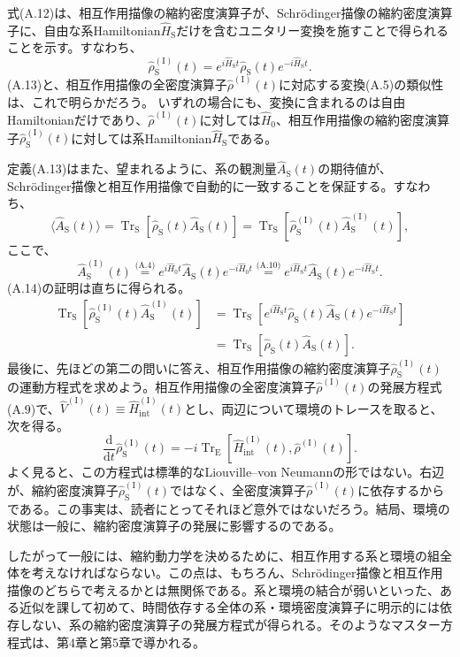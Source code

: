 式(A.12)は、相互作用描像の縮約密度演算子が、Schrödinger描像の縮約密度演算子に、自由な系Hamiltonian$\hat H_{\mathrm S}$だけを含むユニタリー変換を施すことで得られることを示す。すなわち、
\begin{equation}
\hat\rho_{\mathrm S}^{(\mathrm I)}(t)=e^{i\hat H_{\mathrm S}t}\hat\rho_{\mathrm S}(t)e^{-i\hat H_{\mathrm S}t}.\tag{A.13}
\end{equation}
(A.13)と、相互作用描像の全密度演算子$\hat\rho^{(\mathrm I)}(t)$に対応する変換(A.5)の類似性は、これで明らかだろう。
\hypertarget{srcpage:382}{}\label{srcpage:382}
いずれの場合にも、変換に含まれるのは自由Hamiltonianだけであり、$\hat\rho^{(\mathrm I)}(t)$に対しては$\hat H_0$、相互作用描像の縮約密度演算子$\hat\rho_{\mathrm S}^{(\mathrm I)}(t)$に対しては系Hamiltonian$\hat H_{\mathrm S}$である。

定義(A.13)はまた、望まれるように、系の観測量$\hat A_{\mathrm S}(t)$の期待値が、Schrödinger描像と相互作用描像で自動的に一致することを保証する。すなわち、
\begin{equation}
\langle\hat A_{\mathrm S}(t)\rangle=\operatorname{Tr}_{\mathrm S}[\hat\rho_{\mathrm S}(t)\hat A_{\mathrm S}(t)]
=\operatorname{Tr}_{\mathrm S}[\hat\rho_{\mathrm S}^{(\mathrm I)}(t)\hat A_{\mathrm S}^{(\mathrm I)}(t)],\tag{A.14}
\end{equation}
ここで、
\begin{equation}
\hat A_{\mathrm S}^{(\mathrm I)}(t)\overset{\text{(A.4)}}=e^{i\hat H_0t}\hat A_{\mathrm S}(t)e^{-i\hat H_0t}
\overset{\text{(A.10)}}=e^{i\hat H_{\mathrm S}t}\hat A_{\mathrm S}(t)e^{-i\hat H_{\mathrm S}t}.\tag{A.15}
\end{equation}
(A.14)の証明は直ちに得られる。
\begin{equation}
\begin{aligned}
\operatorname{Tr}_{\mathrm S}[\hat\rho_{\mathrm S}^{(\mathrm I)}(t)\hat A_{\mathrm S}^{(\mathrm I)}(t)]
&=\operatorname{Tr}_{\mathrm S}[e^{i\hat H_{\mathrm S}t}\hat\rho_{\mathrm S}(t)\hat A_{\mathrm S}(t)e^{-i\hat H_{\mathrm S}t}]\\
&=\operatorname{Tr}_{\mathrm S}[\hat\rho_{\mathrm S}(t)\hat A_{\mathrm S}(t)].
\end{aligned}\tag{A.16}
\end{equation}
最後に、先ほどの第二の問いに答え、相互作用描像の縮約密度演算子$\hat\rho_{\mathrm S}^{(\mathrm I)}(t)$の運動方程式を求めよう。相互作用描像の全密度演算子$\hat\rho^{(\mathrm I)}(t)$の発展方程式(A.9)で、$\hat V^{(\mathrm I)}(t)\equiv\hat H_{\mathrm{int}}^{(\mathrm I)}(t)$とし、両辺について環境のトレースを取ると、次を得る。
\begin{equation}
\frac{\mathrm d}{\mathrm dt}\hat\rho_{\mathrm S}^{(\mathrm I)}(t)
=-i\operatorname{Tr}_{\mathrm E}[\hat H_{\mathrm{int}}^{(\mathrm I)}(t),\hat\rho^{(\mathrm I)}(t)].\tag{A.17}
\end{equation}
よく見ると、この方程式は標準的なLiouville--von Neumannの形ではない。右辺が、縮約密度演算子$\hat\rho_{\mathrm S}^{(\mathrm I)}(t)$ではなく、全密度演算子$\hat\rho^{(\mathrm I)}(t)$に依存するからである。この事実は、読者にとってそれほど意外ではないだろう。結局、環境の状態は一般に、縮約密度演算子の発展に影響するのである。

したがって一般には、縮約動力学を決めるために、相互作用する系と環境の組全体を考えなければならない。この点は、もちろん、Schrödinger描像と相互作用描像のどちらで考えるかとは無関係である。系と環境の結合が弱いといった、ある近似を課して初めて、時間依存する全体の系・環境密度演算子に明示的には依存しない、系の縮約密度演算子の発展方程式が得られる。そのようなマスター方程式は、第4章と第5章で導かれる。
